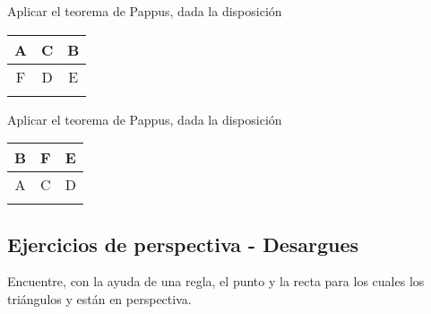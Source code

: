 \newpage
\begin{section-exercise}
    Aplicar el teorema de Pappus, dada la disposición \hspace{0.3cm}
    \begin{tabular}{|c|c|c|}
        \hline
        A&C&B \\\hline
        F&D&E \\\hline\hline
        && \\\hline
    \end{tabular}
    \vspace*{\fill}
    \begin{figure}[H]
        \centering
        
    \end{figure}
    \vspace*{\fill}
\end{section-exercise}

\newpage
\begin{section-exercise}
    Aplicar el teorema de Pappus, dada la disposición \hspace{0.3cm}
    \begin{tabular}{|c|c|c|}
        \hline
        B&F&E \\\hline
        A&C&D \\\hline\hline
        && \\\hline
    \end{tabular}
    \vspace*{\fill}
    \begin{figure}[H]
        \centering
        
    \end{figure}
    \vspace*{\fill}
\end{section-exercise}




\newpage
\subsection{Ejercicios de perspectiva - Desargues}

\begin{section-exercise}
    Encuentre, con la ayuda de una regla, el punto y la recta para los cuales los triángulos  y  están en perspectiva.
    \vspace*{\fill}
    \begin{figure}[H]
        \centering
        
    \end{figure}
    \vspace*{\fill}
\end{section-exercise}

